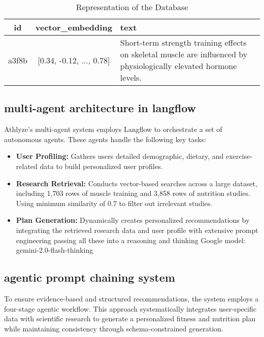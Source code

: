 \documentclass[conference]{IEEEtran}
\begin{document}
\begin{table}[h]
    \caption{Representation of the Database}
    \centering
    \small %
    \begin{tabular}{|c|c|p{2.4cm}|}
        \hline
        \textbf{id} & \textbf{vector\_embedding} &  \textbf{text} \\
        \hline
        a3f8b & [0.34, -0.12, ..., 0.78] & Short-term strength training effects on skeletal muscle are influenced by physiologically elevated hormone levels. \\
        \hline
    \end{tabular}
\end{table}

\subsection{multi-agent architecture in langflow}
Athlyze's multi-agent system employs Langflow \cite{6} to orchestrate a set of autonomous agents. These agents handle the following key tasks:

\begin{itemize}
    \item \textbf{User Profiling:} Gathers users detailed demographic, dietary, and exercise-related data to build personalized user profiles.
    \item \textbf{Research Retrieval:} Conducts vector-based searches across a large dataset, including 1,703 rows of muscle training and 3,858 rows of nutrition studies. Using minimum similarity of 0.7 to filter out irrelevant studies.
    \item \textbf{Plan Generation:} Dynamically creates personalized recommendations by integrating the retrieved research data and user profile with extensive prompt engineering passing all these into a reasoning and thinking Google model: gemini-2.0-flash-thinking
\end{itemize}

\subsection{agentic prompt chaining system}
To ensure evidence-based and structured recommendations, the system employs a four-stage agentic workflow. This approach systematically integrates user-specific data with scientific research to generate a personalized fitness and nutrition plan while maintaining consistency through schema-constrained generation.
\end{document}
